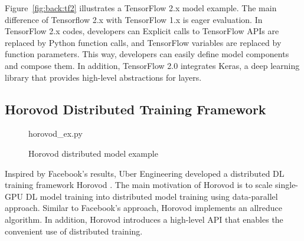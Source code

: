 Figure~\ref{fig:back:tf2} illustrates a TensorFlow 2.x model example.
The main difference of Tensorflow 2.x with TensorFlow 1.x is eager evaluation.
In TensorFlow 2.x codes, developers can 
Explicit calls to TensorFlow APIs are replaced by Python function calls,
and TensorFlow variables are replaced by function parameters.
This way, developers can easily define model components and compose them. 
In addition, TensorFlow 2.0 integrates Keras\cite{keras},
a deep learning library that provides high-level abstractions for layers.

\subsection{Horovod Distributed Training Framework}

\begin{figure}
 
{horovod_ex.py}
  \caption{Horovod distributed model example}
\label{fig:back:hvd} 
\end{figure}

% 
Inspired by Facebook's results, Uber Engineering developed a distributed DL
training framework Horovod \cite{sergeev2018horovod}. 
The main motivation of Horovod is to scale single-GPU DL model training
into distributed model training using data-parallel approach. 
Similar to Facebook's approach, Horovod implements an allreduce algorithm. 
In addition, Horovod introduces a high-level API that enables
the convenient use of distributed training.  
